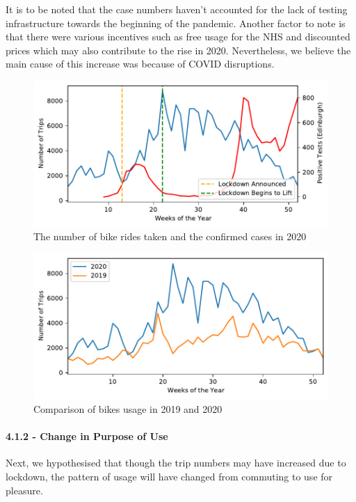 \documentclass[11pt,a4paper]{article}
\begin{document}
It is to be noted that the case numbers haven’t accounted for the lack of testing infrastructure towards the beginning of the pandemic. Another factor to note is that there were various incentives such as free usage for the NHS and discounted prices which may also contribute to the rise in 2020. Nevertheless, we believe the main cause of this increase was because of COVID disruptions.


\begin{figure}[h]
  \centering
  \includegraphics{report/1}
  \caption{The number of bike rides taken and the confirmed cases in 2020}
  \label{bike usage:fig:1}
\end{figure}

\begin{figure}[H]
  \centering
  \includegraphics{report/2}
  \caption{Comparison of bikes usage in 2019 and 2020}
  \label{bike:fig:2}
\end{figure}


\paragraph{4.1.2 - Change in Purpose of Use}
Next, we hypothesised that though the trip numbers may have increased due to lockdown, the pattern of usage will have changed from commuting to use for pleasure.
\end{document}
